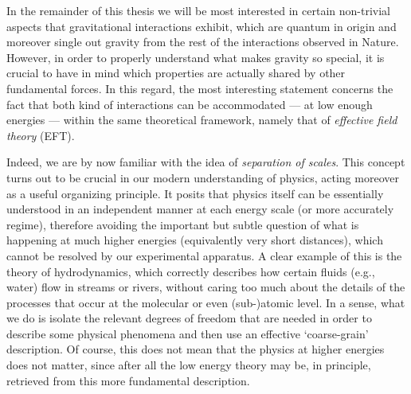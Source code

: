 
In the remainder of this thesis we will be most interested in certain non-trivial aspects that gravitational interactions exhibit, which are quantum in origin and moreover single out gravity from the rest of the interactions observed in Nature. However, in order to properly understand what makes gravity so special, it is crucial to have in mind which properties are actually shared by other fundamental forces. In this regard, the most interesting statement concerns the fact that both kind of interactions can be accommodated --- at low enough energies --- within the same theoretical framework, namely that of \emph{effective field theory} (EFT).

Indeed, we are by now familiar with the idea of \emph{separation of scales}. This concept turns out to be crucial in our modern understanding of physics, acting moreover as a useful organizing principle. It posits that physics itself can be essentially understood in an independent manner at each energy scale (or more accurately regime), therefore avoiding the important but subtle question of what is happening at much higher energies (equivalently very short distances), which cannot be resolved by our experimental apparatus. A clear example of this is the theory of hydrodynamics, which correctly describes how certain fluids (e.g., water) flow in streams or rivers, without caring too much about the details of the processes that occur at the molecular or even (sub-)atomic level. In a sense, what we do is isolate the relevant degrees of freedom that are needed in order to describe some physical phenomena and then use an effective `coarse-grain' description. Of course, this does not mean that the physics at higher energies does not matter, since after all the low energy theory may be, in principle, retrieved from this more fundamental description. 

